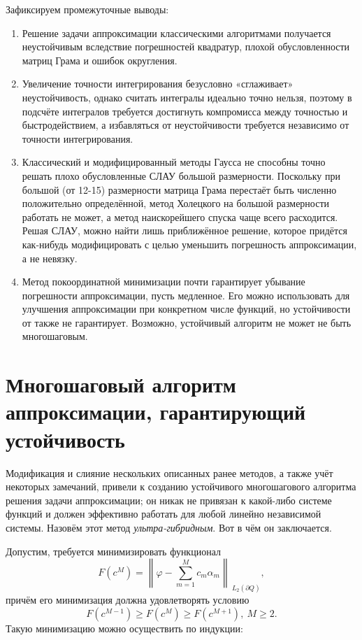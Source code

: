 ﻿\documentclass[a4paper, 12pt]{article}
\begin{document}
Зафиксируем промежуточные выводы:
\begin{enumerate}
\item  Решение задачи аппроксимации классическими алгоритмами получается неустойчивым вследствие погрешностей квадратур, плохой обусловленности матриц Грама и ошибок округления.

\item  Увеличение точности интегрирования безусловно «сглаживает» неустойчивость, однако считать интегралы идеально точно нельзя, поэтому в подсчёте интегралов требуется достигнуть компромисса между точностью и быстродействием, а избавляться от неустойчивости требуется независимо от точности интегрирования.

\item  Классический и модифицированный методы Гаусса не способны точно решать плохо обусловленные СЛАУ большой размерности. Поскольку при большой (от 12-15) размерности матрица Грама перестаёт быть численно положительно определённой, метод Холецкого на большой размерности работать не может, а метод наискорейшего спуска чаще всего расходится. Решая СЛАУ, можно найти лишь приближённое решение, которое придётся как-нибудь модифицировать с целью уменьшить погрешность аппроксимации, а не невязку.

\item  Метод покоординатной минимизации почти гарантирует убывание погрешности аппроксимации, пусть медленное. Его можно использовать для улучшения аппроксимации при конкретном числе функций, но устойчивости от также не гарантирует. Возможно, устойчивый алгоритм не может не быть многошаговым.
\end{enumerate}

\section{Многошаговый алгоритм аппроксимации, гарантирующий устойчивость}

Модификация и слияние нескольких описанных ранее методов, а также учёт некоторых замечаний, привели к созданию устойчивого многошагового алгоритма решения задачи аппроксимации; он никак не привязан к какой-либо системе функций и должен эффективно работать для любой линейно независимой системы. Назовём этот метод {\it ультра-гибридным}. Вот в чём он заключается.

Допустим, требуется минимизировать функционал
\begin{equation}F\left(c^M\right)={\left\|\varphi -\sum^M_{m=1}{c_m}{\alpha }_m\right\|}_{{\ L}_2\left(\partial Q\right)},\end{equation} 
причём его минимизация должна удовлетворять условию
\begin{equation}F\left(c^{M-1}\right)\ge F\left(c^M\right)\ge F\left(c^{M+1}\right),\ M\ge 2.\end{equation} 
Такую минимизацию можно осуществить по индукции:
\end{document}
